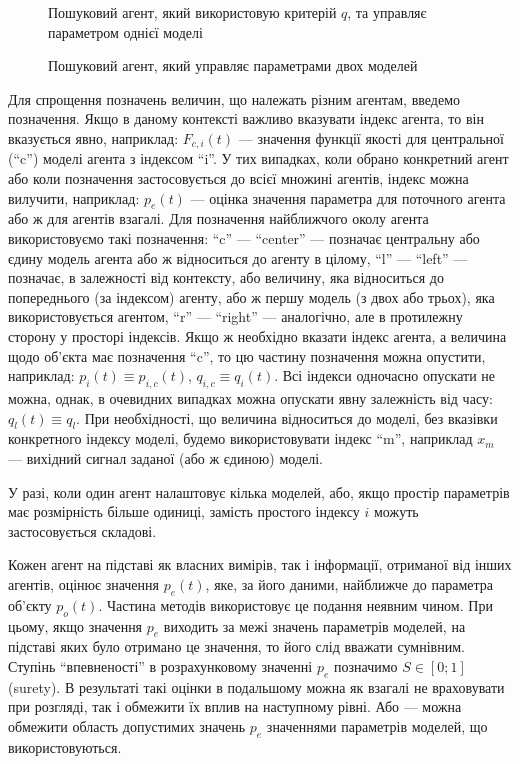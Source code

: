 \begin{figure}[htb!]
\begin{center}

\end{center}
\caption{Пошуковий агент, який використовую критерій $q$, та управляє параметром однієї моделі}
\label{atu:f:agent1q}
\end{figure}


\begin{figure}[htb!]
\begin{center}

\end{center}
\caption{Пошуковий агент, який управляє параметрами двох моделей}
\label{atu:f:agent2}
\end{figure}

Для спрощення позначень величин, що належать різним агентам, введемо
позначення. Якщо в даному контексті важливо вказувати індекс агента, то він
вказується явно, наприклад: $F_{c, i}(t)$ --- значення функції якості для
центральної (``c'') моделі агента з індексом ``i''. У тих випадках, коли
обрано конкретний агент або коли позначення застосовується до всієї множині
агентів, індекс можна вилучити, наприклад: $p_e(t)$
--- оцінка значення параметра для поточного агента або ж для агентів взагалі.
Для позначення найближчого околу агента використовуємо такі позначення:
``c'' --- ``center'' --- позначає центральну або єдину модель агента або ж
відноситься до агенту в цілому, ``l'' --- ``left'' --- позначає, в
залежності від контексту, або величину, яка відноситься до попереднього (за
індексом) агенту, або ж першу модель (з двох або трьох), яка використовується
агентом, ``r'' --- ``right'' --- аналогічно, але в протилежну сторону у
просторі індексів.
Якщо ж необхідно вказати індекс агента, а величина щодо
об'єкта має позначення ``c'', то цю частину позначення можна опустити,
наприклад: $p_i(t) \equiv p_{i,c}(t)$,
$q_{i,c} \equiv q_{i}(t)$.
Всі індекси одночасно опускати не можна, однак, в очевидних випадках можна
опускати явну залежність від часу: $q_l(t) \equiv q_l$. При необхідності,
що величина відноситься до моделі, без вказівки конкретного індексу моделі,
будемо використовувати індекс ``m'', наприклад $x_m$ --- вихідний сигнал
заданої (або ж єдиною) моделі.

У разі, коли один агент налаштовує кілька моделей, або, якщо
простір параметрів має розмірність більше одиниці, замість
простого індексу
$i$ можуть застосовується складові.

Кожен агент на підставі як власних вимірів, так і інформації, отриманої від
інших агентів, оцінює значення $p_e(t)$, яке, за його даними, найближче до
параметра об'єкту $p_o(t)$.
Частина методів використовує це подання неявним чином. При цьому,
якщо значення $p_e$ виходить за межі значень параметрів моделей, на підставі
яких було отримано це значення, то його слід вважати сумнівним.
Ступінь ``впевненості'' в розрахунковому значенні $p_e$ позначимо
$S \in [0; 1]$\label{atu:d:S} (surety).
В результаті такі оцінки в подальшому можна як
взагалі не враховувати при розгляді, так і обмежити їх вплив на наступному
рівні.
Або --- можна обмежити область допустимих значень $p_e$
значеннями параметрів моделей, що використовуються.

